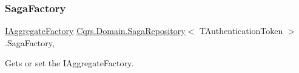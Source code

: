 \mbox{\label{classCqrs_1_1Domain_1_1SagaRepository_a578164fa38728f3a23ca41d8c81611e0_a578164fa38728f3a23ca41d8c81611e0}} 
\subsubsection{\texorpdfstring{Saga\+Factory}{SagaFactory}}
{\footnotesize\ttfamily \hyperlink{interfaceCqrs_1_1Domain_1_1Factories_1_1IAggregateFactory}{I\+Aggregate\+Factory} \hyperlink{classCqrs_1_1Domain_1_1SagaRepository}{Cqrs.\+Domain.\+Saga\+Repository}$<$ T\+Authentication\+Token $>$.Saga\+Factory\hspace{0.3cm}{\ttfamily [get]}, {\ttfamily [protected]}}



Gets or set the I\+Aggregate\+Factory. 

